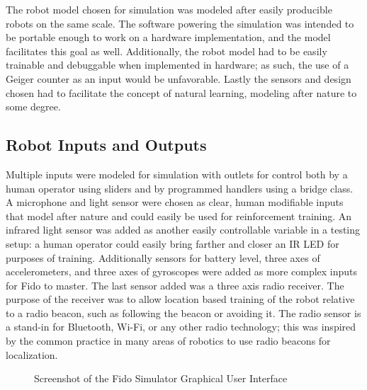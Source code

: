 The robot model chosen for simulation was modeled after easily producible robots on the same scale.  The software powering the simulation was intended to be portable enough to work on a hardware implementation, and the model facilitates this goal as well.  Additionally, the robot model had to be easily trainable and debuggable when implemented in hardware; as such, the use of a Geiger counter as an input would be unfavorable.  Lastly the sensors and design chosen had to facilitate the concept of natural learning, modeling after nature to some degree.

\subsection{Robot Inputs and Outputs}

Multiple inputs were modeled for simulation with outlets for control both by a human operator using sliders and by programmed handlers using a bridge class.  A microphone and light sensor were chosen as clear, human modifiable inputs that model after nature and could easily be used for reinforcement training.  An infrared light sensor was added as another easily controllable variable in a testing setup: a human operator could easily bring farther and closer an IR LED for purposes of training.   Additionally sensors for battery level, three axes of accelerometers, and three axes of gyroscopes were added as more complex inputs for Fido to master.  The last sensor added was a three axis radio receiver.  The purpose of the receiver was to allow location based training of the robot relative to a radio beacon, such as following the beacon or avoiding it.  The radio sensor is a stand-in for Bluetooth, Wi-Fi, or any other radio technology; this was inspired by the common practice in many areas of robotics to use radio beacons for localization.

\begin{figure}
	\centering
	\caption{Screenshot of the Fido Simulator Graphical User Interface}
\end{figure}

